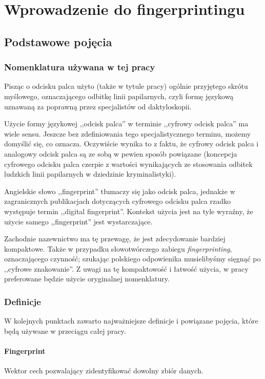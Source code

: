 \chapter{Wprowadzenie do fingerprintingu}

\section{Podstawowe pojęcia}

\subsection{Nomenklatura używana w tej pracy}
Pisząc o odcisku palca użyto (także w tytule pracy) ogólnie przyjętego skrótu
myślowego, oznaczającego odbitkę linii papilarnych, czyli formę językową
uznawaną za poprawną przez specjalistów od daktyloskopii.

Użycie formy językowej ,,odcisk palca'' w terminie ,,cyfrowy odcisk palca'' ma
wiele sensu. Jeszcze bez zdefiniowania tego specjalistycznego terminu, możemy
domyślić się, co oznacza. Oczywiście wynika to z faktu, że cyfrowy odcisk palca
i analogowy odcisk palca są ze sobą w pewien sposób powiązane (koncepcja
cyfrowego odcisku palca czerpie z wartości wynikających ze stosowania odbitek
ludzkich linii papilarnych w dziedzinie kryminalistyki).

Angielskie słowo ,,fingerprint'' tłumaczy się jako odcisk palca, jednakże w
zagranicznych publikacjach dotyczących cyfrowego odcisku palca rzadko występuje
termin ,,digital fingerprint''. Kontekst użycia jest na tyle wyraźny, że użycie
samego ,,fingerprint'' jest wystarczające.

Zachodnie nazewnictwo ma tę przewagę, że jest zdecydowanie bardziej kompaktowe.
Także w przypadku słowotwórczego zabiegu \emph{fingerprinting}, oznaczającego
czynność; szukając polskiego odpowienika musielibyśmy sięgnąć po ,,cyfrowe
znakowanie''. Z uwagi na tę kompaktowość i łatwość użycia, w pracy preferowane
będzie użycie oryginalnej nomenklatury.

\subsection{Definicje}
W kolejnych punktach zawarto najważniejsze definicje i powiązane pojęcia, które
będą używane w przeciągu całej pracy.

\subsubsection{Fingerprint}
Wektor cech pozwalający zidentyfikować dowolny zbiór danych.

